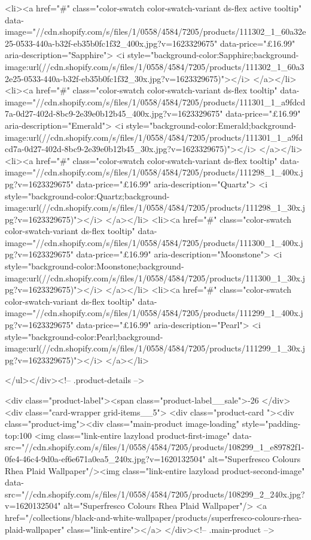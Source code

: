 {{{{{{{<li><a href="#" class="color-swatch color-swatch-variant ds-flex active tooltip" data-image="//cdn.shopify.com/s/files/1/0558/4584/7205/products/111302_1_60a32e25-0533-440a-b32f-eb35b0fc1f32_400x.jpg?v=1623329675" data-price="£16.99" aria-description="Sapphire">
              <i style="background-color:Sapphire;background-image:url(//cdn.shopify.com/s/files/1/0558/4584/7205/products/111302_1_60a32e25-0533-440a-b32f-eb35b0fc1f32_30x.jpg?v=1623329675)"></i>
            </a></li>
<li><a href="#" class="color-swatch color-swatch-variant ds-flex tooltip" data-image="//cdn.shopify.com/s/files/1/0558/4584/7205/products/111301_1_a9fdcd7a-0d27-402d-8bc9-2e39e0b12b45_400x.jpg?v=1623329675" data-price="£16.99" aria-description="Emerald">
              <i style="background-color:Emerald;background-image:url(//cdn.shopify.com/s/files/1/0558/4584/7205/products/111301_1_a9fdcd7a-0d27-402d-8bc9-2e39e0b12b45_30x.jpg?v=1623329675)"></i>
            </a></li>
<li><a href="#" class="color-swatch color-swatch-variant ds-flex tooltip" data-image="//cdn.shopify.com/s/files/1/0558/4584/7205/products/111298_1_400x.jpg?v=1623329675" data-price="£16.99" aria-description="Quartz">
              <i style="background-color:Quartz;background-image:url(//cdn.shopify.com/s/files/1/0558/4584/7205/products/111298_1_30x.jpg?v=1623329675)"></i>
            </a></li>
<li><a href="#" class="color-swatch color-swatch-variant ds-flex tooltip" data-image="//cdn.shopify.com/s/files/1/0558/4584/7205/products/111300_1_400x.jpg?v=1623329675" data-price="£16.99" aria-description="Moonstone">
              <i style="background-color:Moonstone;background-image:url(//cdn.shopify.com/s/files/1/0558/4584/7205/products/111300_1_30x.jpg?v=1623329675)"></i>
            </a></li>
<li><a href="#" class="color-swatch color-swatch-variant ds-flex tooltip" data-image="//cdn.shopify.com/s/files/1/0558/4584/7205/products/111299_1_400x.jpg?v=1623329675" data-price="£16.99" aria-description="Pearl">
              <i style="background-color:Pearl;background-image:url(//cdn.shopify.com/s/files/1/0558/4584/7205/products/111299_1_30x.jpg?v=1623329675)"></i>
            </a></li>

      </ul></div><!-- .product-details -->

<div class="product-label"><span class="product-label__sale">-26%
          </div><div class="card-wrapper grid-items__5">
            <div class="product-card "><div class="product-img"><div class="main-product image-loading" style="padding-top:100%
      <img class="link-entire lazyload product-first-image" data-src="//cdn.shopify.com/s/files/1/0558/4584/7205/products/108299_1_e89782f1-0fe4-46c4-9d0a-ef6e671a0ea5_240x.jpg?v=1620132504" alt="Superfresco Colours Rhea Plaid Wallpaper"/><img class="link-entire lazyload product-second-image" data-src="//cdn.shopify.com/s/files/1/0558/4584/7205/products/108299_2_240x.jpg?v=1620132504" alt="Superfresco Colours Rhea Plaid Wallpaper"/>
      <a href="/collections/black-and-white-wallpaper/products/superfresco-colours-rhea-plaid-wallpaper" class="link-entire"></a>
    </div><!-- .main-product -->
  
}}}}}}}
